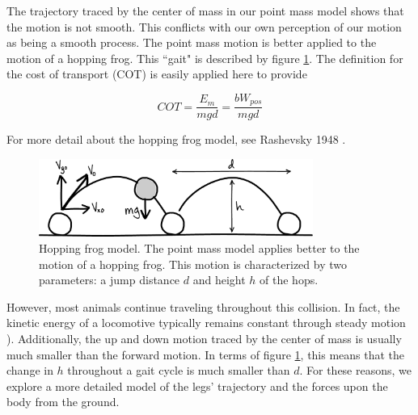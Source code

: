 The trajectory traced by the center of mass in our point mass model shows that the motion is not smooth. This conflicts with our own perception of our motion as being a smooth process. The point mass motion is better applied to the motion of a hopping frog. This ``gait" is described by figure \ref{fig:HoppingFrogModel}. The definition for the cost of transport (COT) is easily applied here to provide 

\begin{equation}
COT = \frac{E_{m}}{mgd} = \frac{bW_{pos}}{mgd}
\end{equation}

For more detail about the hopping frog model, see Rashevsky 1948 \cite{rashevsky48}.

\begin{figure}[h]		%
\begin{centering}
\includegraphics[width=0.8\textwidth]{Figures/HoppingFrogModel}\par
\end{centering}
\caption[Diagram: Hopping Frog Model]{Hopping frog model. The point mass model applies better to the motion of a hopping frog. This motion is characterized by two parameters: a jump distance $d$ and height $h$ of the hops.}
\label{fig:HoppingFrogModel}
\end{figure}
%

However, most animals continue traveling throughout this collision. In fact, the kinetic energy of a locomotive typically remains constant through steady motion \cite{ruina05}). Additionally, the up and down motion traced by the center of mass is usually much smaller than the forward motion. In terms of figure \ref{fig:HoppingFrogModel}, this means that the change in $h$ throughout a gait cycle is much smaller than $d$. For these reasons, we explore a more detailed model of the legs' trajectory and the forces upon the body from the ground.


